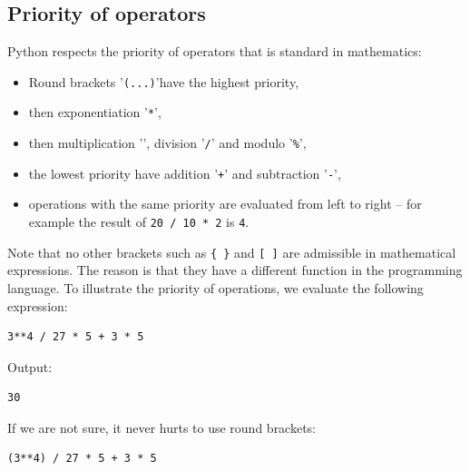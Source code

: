 \documentclass[article,A4,12pt]{llncs}
\begin{document}
\subsection{Priority of operators}
Python respects the priority of operators that 
is standard in mathematics:

\begin{itemize} 
\item Round brackets '{\tt (...)}'have the highest priority,
\item then exponentiation '{\tt **}', 
\item then multiplication '{\tt *}', division '{\tt /}' and modulo '{\tt \%}', 
\item the lowest priority have addition '{\tt +}' and subtraction '{\tt -}',
\item operations with the same priority are evaluated from left to right -- for
      example the result of {\tt 20 / 10 * 2} is {\tt 4}. 
\end{itemize}
Note that no other brackets such as {\tt \{ \}} and {\tt [ ]} are 
admissible in mathematical expressions. The reason is that they have a different 
function in the programming language.
To illustrate the priority of operations, we evaluate the following 
expression:\\

\begin{bbox}
\begin{verbatim}
3**4 / 27 * 5 + 3 * 5
\end{verbatim}
\end{bbox}
\vspace{6mm}

\noindent
Output:\\

\begin{ybox}
\begin{verbatim}
30
\end{verbatim}
\end{ybox}
\vspace{6mm}

\noindent
If we are not sure, it never hurts to use round brackets:\\

\begin{bbox}
\begin{verbatim}
(3**4) / 27 * 5 + 3 * 5
\end{verbatim}
\end{bbox}
\vspace{6mm}
\end{document}
